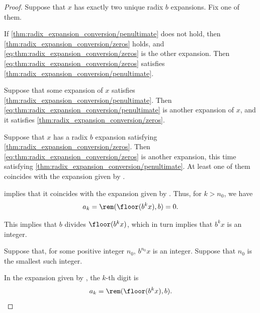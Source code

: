 \begin{proof}
   Suppose that \( x \) has exactly two unique radix \( b \) expansions. Fix one of them.

  If \cref{thm:radix_expansion_conversion/penultimate} does not hold, then \cref{thm:radix_expansion_conversion/zeros} holds, and \eqref{eq:thm:radix_expansion_conversion/zeros} is the other expansion. Then \eqref{eq:thm:radix_expansion_conversion/zeros} satisfies \cref{thm:radix_expansion_conversion/penultimate}.

   Suppose that some expansion of \( x \) satisfies \cref{thm:radix_expansion_conversion/penultimate}. Then \eqref{eq:thm:radix_expansion_conversion/penultimate} is another expansion of \( x \), and it satisfies \cref{thm:radix_expansion_conversion/zeros}.

   Suppose that \( x \) has a radix \( b \) expansion satisfying \cref{thm:radix_expansion_conversion/zeros}. Then \eqref{eq:thm:radix_expansion_conversion/zeros} is another expansion, this time satisfying \cref{thm:radix_expansion_conversion/penultimate}. At least one of them coincides with the expansion given by .

   implies that it coincides with the expansion given by . Thus, for \( k > n_0 \), we have
  \begin{equation*}
    a_k = \rem(\floor(b^k x), b) = 0.
  \end{equation*}

  This implies that \( b \) divides \( \floor(b^k x) \), which in turn implies that \( b^k x \) is an integer.

   Suppose that, for some positive integer \( n_0 \), \( b^{n_0} x \) is an integer. Suppose that \( n_0 \) is the smallest such integer.

  In the expansion given by , the \( k \)-th digit is
  \begin{equation*}
    a_k = \rem(\floor(b^k x), b).
  \end{equation*}


\end{proof}
